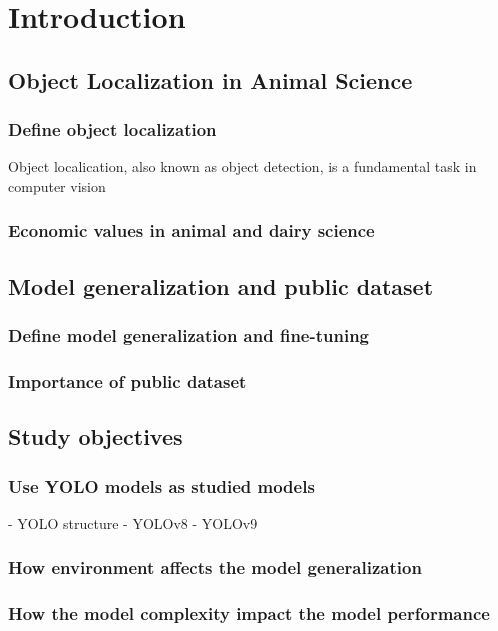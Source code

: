 \section{Introduction}

\subsection*{Object Localization in Animal Science}

\subsubsection*{Define object localization}
Object localication, also known as object detection, is a fundamental task in computer vision 

\subsubsection*{Economic values in animal and dairy science}

\subsection*{Model generalization and public dataset}

\subsubsection*{Define model generalization and fine-tuning}

\subsubsection*{Importance of public dataset}


\subsection*{Study objectives}

\subsubsection*{Use YOLO models as studied models}
- YOLO structure
- YOLOv8
- YOLOv9
\subsubsection*{How environment affects the model generalization}

\subsubsection*{How the model complexity impact the model performance}

